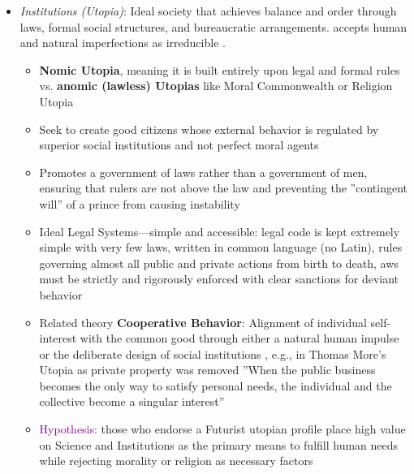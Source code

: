 \documentclass[jou,floatsintext]{apa7}
\begin{document}
\begin{itemize}
\begin{itemize}
    \item \textit{Institutions (Utopia)}: Ideal society that achieves balance and order through laws, formal social structures, and bureaucratic arrangements. accepts human and natural imperfections as irreducible \parencite{aviles14LawBasedUtopia2001}.
    \begin{itemize}
        \item \textbf{Nomic Utopia}, meaning it is built entirely upon legal and formal rules vs. \textbf{anomic (lawless) Utopias} like Moral Commonwealth or Religion Utopia \parencite{aviles14LawBasedUtopia2001}
        \item Seek to create good citizens whose external behavior is regulated by superior social institutions and not perfect moral agents \parencite{aviles14LawBasedUtopia2001}
        \item Promotes a government of laws rather than a government of men, ensuring that rulers are not above the law and preventing the ''contingent will'' of a prince from causing instability \parencite{aviles14LawBasedUtopia2001}
        \item Ideal Legal Systems---simple and accessible:  legal code is kept extremely simple with very few laws, written in common language (no Latin),  rules governing almost all public and private actions from birth to death, aws must be strictly and rigorously enforced with clear sanctions for deviant behavior \parencite{aviles14LawBasedUtopia2001}
        \item[$\rightarrow$] Related theory \textbf{Cooperative Behavior}: Alignment of individual self-interest with the common good through either a natural human impulse or the deliberate design of social institutions \parencite{vandenheuvalLiberalismCommunitarianismSearch2006}, e.g., in Thomas More’s Utopia as private property was removed ''When the public business becomes the only way to satisfy personal needs, the individual and the collective become a singular interest'' \parencite{davisThomasMoresUtopia2010}
        \item \textcolor{purple}{Hypothesis:} those who endorse a Futurist utopian profile place high value on Science and Institutions as the primary means to fulfill human needs while rejecting morality or religion as necessary factors \parencite[see empirical results in][]{fernandoProfilesIdealSociety2023}
    \end{itemize}
    

\end{itemize}
\end{itemize}
\end{document}
